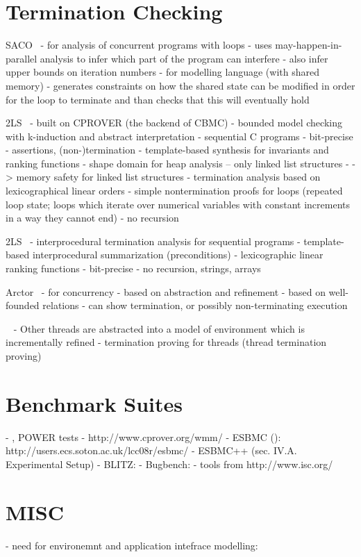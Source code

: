 \section{Termination Checking}

SACO~\cite{Albert2017}
- for analysis of concurrent programs with loops
- uses may-happen-in-parallel analysis to infer which part of the program can interfere
- also infer upper bounds on iteration numbers
- for modelling language (with shared memory)
- generates constraints on how the shared state can be modified in order for the loop to terminate and than checks that this will eventually hold

2LS~\cite{Malik2018}
- built on CPROVER (the backend of CBMC)
- bounded model checking with k-induction and abstract interpretation
- sequential C programs
- bit-precise
- assertions, (non-)termination
- template-based synthesis for invariants and ranking functions
- shape domain for heap analysis -- only linked list structures
  - -> memory safety for linked list structures
- termination analysis based on lexicographical linear orders
- simple nontermination proofs for loops (repeated loop state; loops which iterate over numerical variables with constant increments in a way they cannot end)
- no recursion

2LS~\cite{Chen2017}
- interprocedural termination analysis for sequential programs
- template-based interprocedural summarization (preconditions)
- lexicographic linear ranking functions
- bit-precise
- no recursion, strings, arrays

Arctor~\cite{Kupriyanov2014}
- for concurrency
- based on abstraction and refinement
- based on well-founded relations
- can show termination, or possibly non-terminating execution


~\cite{Cook2007thr}
- Other threads are abstracted into a model of environment which is incrementally refined
- termination proving for threads (thread termination proving)


\section{Benchmark Suites}

- \cite{Sarkar2011}, \cite{MadorHaim2012} POWER tests
- http://www.cprover.org/wmm/
- ESBMC (\cite{Cordeiro2011}): http://users.ecs.soton.ac.uk/lcc08r/esbmc/
- ESBMC++ \cite{Ramalho2016:19,6,27,.} (sec. IV.A. Experimental Setup)
- BLITZ:
  - Bugbench: %
  - tools from http://www.isc.org/

\section{MISC}

- need for environemnt and application intefrace modelling: \cite{Cordeiro2016}

